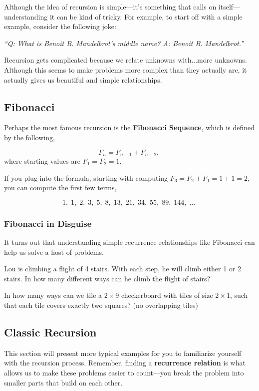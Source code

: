 Although the idea of recursion is simple---it's something that calls on itself---understanding it can be kind of tricky. For example, to start off with a simple example, consider the following joke:
\begin{center}
\textit{``Q: What is Benoit B. Mandelbrot's middle name? A: Benoit B. Mandelbrot.''}
\end{center}
Recursion gets complicated because we relate unknowns with...more unknowns. Although this seems to make problems more complex than they actually are, it actually gives us beautiful and simple relationships.

\subsection{Fibonacci}
Perhaps the most famous recursion is the \textbf{Fibonacci Sequence}, which is defined by the following, 

\begin{equation}
    F_n = F_{n-1} + F_{n-2},\!\, 
\end{equation}
where starting values are $F_1=F_2=1$.

If you plug into the formula, starting with computing $F_3 = F_2+F_1 = 1+1 =2$, you can compute the first few terms,

$$ 1,\;1,\;2,\;3,\;5,\;8,\;13,\;21,\;34,\;55,\;89,\;144,\; \ldots\; $$

\subsubsection{Fibonacci in Disguise}
It turns out that understanding simple recurrence relationships like Fibonacci can help us solve a host of problems. 

\begin{ex}
Lou is climbing a  flight of 4 stairs.  With each step, he will climb either 1 or 2 stairs.
In how many different ways can he climb the flight of stairs?
\end{ex}

\begin{ex}
In how many ways can we tile a $2\times9$ checkerboard with tiles of size $2\times 1$, such that each tile covers exactly two squares? (no overlapping tiles)
\end{ex}

\subsection{Classic Recursion}
This section will present more typical examples for you to familiarize yourself with the recursion process. Remember, finding a \textbf{recurrence relation} is what allows us to make these problems easier to count---you break the problem into smaller parts that build on each other.


